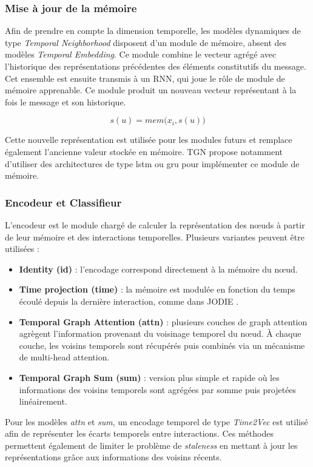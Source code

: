 \documentclass[a4paper,11pt,twoside]{StyleThese}
\begin{document}
\subsubsection{Mise à jour de la mémoire}
Afin de prendre en compte la dimension temporelle, les modèles dynamiques de type \textit{Temporal Neighborhood} disposent d'un module de mémoire, absent des modèles \textit{Temporal Embedding}. Ce module combine le vecteur agrégé avec l’historique des représentations précédentes des éléments constitutifs du message. Cet ensemble est ensuite transmis à un RNN, qui joue le rôle de module de mémoire apprenable. Ce module produit un nouveau vecteur représentant à la fois le message et son historique. 

\[
s(u) = mem(x_i, s(u) \big)
\]

Cette nouvelle représentation est utilisée pour les modules futurs et remplace également l’ancienne valeur stockée en mémoire. TGN \cite{tgn} propose notamment d’utiliser des architectures de type \gls{lstm} ou \gls{gru} pour implémenter ce module de mémoire.

\subsubsection{Encodeur et Classifieur}
L’encodeur est le module chargé de calculer la représentation des nœuds à partir de leur mémoire et des interactions temporelles. Plusieurs variantes peuvent être utilisées :

\begin{itemize}
    \item \textbf{Identity (id)} : l’encodage correspond directement à la mémoire du nœud.
    \item \textbf{Time projection (time)} : la mémoire est modulée en fonction du temps écoulé depuis la dernière interaction, comme dans JODIE \cite{jodie}.
    \item \textbf{Temporal Graph Attention (attn)} : plusieurs couches de graph attention agrègent l’information provenant du voisinage temporel du nœud. À chaque couche, les voisins temporels sont récupérés puis combinés via un mécanisme de multi-head attention.
    \item \textbf{Temporal Graph Sum (sum)} : version plus simple et rapide où les informations des voisins temporels sont agrégées par somme puis projetées linéairement.
\end{itemize}

Pour les modèles \textit{attn} et \textit{sum}, un encodage temporel de type \textit{Time2Vec} est utilisé afin de représenter les écarts temporels entre interactions. Ces méthodes permettent également de limiter le problème de \textit{staleness} en mettant à jour les représentations grâce aux informations des voisins récents.
\end{document}
